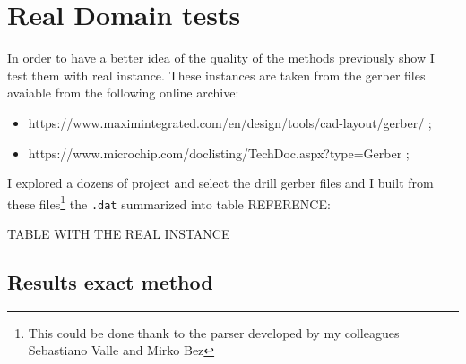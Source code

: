 \section{Real Domain tests}

	In order to have a better idea of the quality of the methods previously show I test them with real instance. These instances are taken from the gerber files avaiable from the following online archive:
	\begin{itemize}
		\item https://www.maximintegrated.com/en/design/tools/cad-layout/gerber/ ;
		\item https://www.microchip.com/doclisting/TechDoc.aspx?type=Gerber ;
	\end{itemize}

	I explored a dozens of project and select the drill gerber files and I built from these files\footnote{This could be done thank to the parser developed by my colleagues Sebastiano Valle and Mirko Bez} the \verb|.dat| summarized into table REFERENCE:
	
	TABLE WITH THE REAL INSTANCE
	
	\subsection{Results exact method}